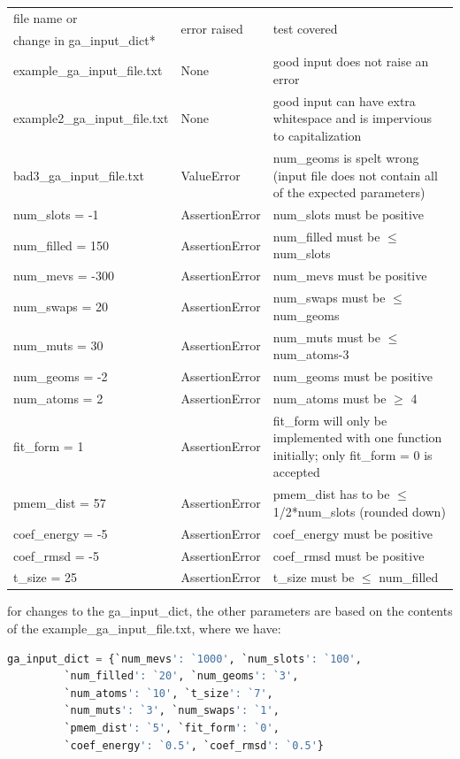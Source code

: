 \documentclass[12pt, titlepage]{article}
\begin{document}
\begin{enumerate}
\begin{table}[H]
	\begin{tabularx}{\textwidth}{p{5cm}p{3cm}p{6.5cm}}
		\toprule
		file name or & \multirow{2}{*}{error raised} & \multirow{2}{*}{test 
		covered} \\
		change in ga\_input\_dict*& & \\
		\midrule
		example\_ga\_input\_file.txt & None & good input does not raise an 
		error \\
		example2\_ga\_input\_file.txt & None & good input can have extra 
		whitespace and is impervious to capitalization \\
		bad3\_ga\_input\_file.txt & ValueError & num\_geoms is spelt wrong 
		(input file does not contain all of the expected parameters) \\
		num\_slots = -1 & AssertionError & num\_slots must be positive \\
		num\_filled = 150 & AssertionError & num\_filled must be $\leq$ 
		num\_slots \\
		num\_mevs = -300 & AssertionError & num\_mevs must be positive \\
		num\_swaps = 20 & AssertionError & num\_swaps must be $\leq$ num\_geoms 
		\\
		num\_muts = 30 & AssertionError & num\_muts must be $\leq$ num\_atoms-3 
		\\
		num\_geoms = -2 & AssertionError & num\_geoms must be positive \\
		num\_atoms = 2 & AssertionError & num\_atoms must be $\geq$ 4 \\
		fit\_form = 1 & AssertionError & fit\_form will only be implemented 
		with one function initially; only fit\_form = 0 is accepted \\
		pmem\_dist = 57 & AssertionError & pmem\_dist has to be $\leq$ 
		1/2*num\_slots (rounded down) \\
		coef\_energy = -5 & AssertionError & coef\_energy must be positive \\
		coef\_rmsd = -5 & AssertionError & coef\_rmsd must be positive \\
		t\_size = 25 & AssertionError & t\_size must be $\leq$ num\_filled \\
	\end{tabularx}
\end{table}

\noindent * for changes to the ga\_input\_dict, the other parameters are based 
on the contents of the example\_ga\_input\_file.txt, where we have:
\begin{lstlisting}[language=python, showstringspaces=false]
ga_input_dict = {`num_mevs': `1000', `num_slots': `100',
		 `num_filled': `20', `num_geoms': `3',
		 `num_atoms': `10', `t_size': `7',
		 `num_muts': `3', `num_swaps': `1',
		 `pmem_dist': `5', `fit_form': `0',
		 `coef_energy': `0.5', `coef_rmsd': `0.5'}
\end{lstlisting}
					

\end{enumerate}
\end{document}
